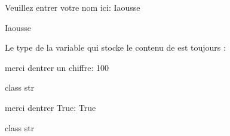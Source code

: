 \documentclass[letterpaper,10pt,french]{sphinxmanual}
\begin{document}
\begin{sphinxVerbatim}[commandchars=\\\{\}]
Veuillez entrer votre nom ici:  Iaousse
\end{sphinxVerbatim}

\begin{sphinxVerbatim}[commandchars=\\\{\}]
Iaousse
\end{sphinxVerbatim}

\sphinxAtStartPar
Le type de la variable qui stocke le contenu de  est toujours :

\begin{sphinxVerbatim}[commandchars=\\\{\}]
  
\end{sphinxVerbatim}

\begin{sphinxVerbatim}[commandchars=\\\{\}]
merci d\PYGZsq{}entrer un chiffre:  100
\end{sphinxVerbatim}

\begin{sphinxVerbatim}[commandchars=\\\{\}]
\PYGZlt{}class \PYGZsq{}str\PYGZsq{}\PYGZgt{}
\end{sphinxVerbatim}

\begin{sphinxVerbatim}[commandchars=\\\{\}]
  
\end{sphinxVerbatim}

\begin{sphinxVerbatim}[commandchars=\\\{\}]
merci d\PYGZsq{}entrer True:  True
\end{sphinxVerbatim}

\begin{sphinxVerbatim}[commandchars=\\\{\}]
\PYGZlt{}class \PYGZsq{}str\PYGZsq{}\PYGZgt{}
\end{sphinxVerbatim}
\end{document}
